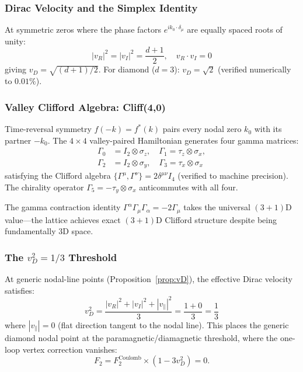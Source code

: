 \documentclass[aps,prd,onecolumn,superscriptaddress,floatfix,12pt]{revtex4-2}
\begin{document}
\subsubsection{Dirac Velocity and the Simplex Identity}

At symmetric zeros where the phase factors $e^{ik_0 \cdot \delta_\mu}$ are equally spaced roots of unity:
\begin{equation}
|v_R|^2 = |v_I|^2 = \frac{d+1}{2}, \quad v_R \cdot v_I = 0
\end{equation}
giving $v_D = \sqrt{(d{+}1)/2}$. For diamond ($d = 3$): $v_D = \sqrt{2}$ (verified numerically to $0.01\%$).

\subsubsection{Valley Clifford Algebra: Cliff(4,0)}

Time-reversal symmetry $f(-k) = f^*(k)$ pairs every nodal zero $k_0$ with its partner $-k_0$. The $4{\times}4$ valley-paired Hamiltonian generates four gamma matrices:
\begin{align}
\Gamma_0 &= I_2 \otimes \sigma_z, \quad \Gamma_1 = \tau_z \otimes \sigma_x, \nonumber \\
\Gamma_2 &= I_2 \otimes \sigma_y, \quad \Gamma_3 = \tau_x \otimes \sigma_x
\end{align}
satisfying the Clifford algebra $\{\Gamma^\mu, \Gamma^\nu\} = 2\delta^{\mu\nu} I_4$ (verified to machine precision). The chirality operator $\Gamma_5 = -\tau_y \otimes \sigma_x$ anticommutes with all four.

The gamma contraction identity $\Gamma^\alpha \Gamma_\mu \Gamma_\alpha = -2\Gamma_\mu$ takes the universal $(3{+}1)$D value---the lattice achieves exact $(3{+}1)$D Clifford structure despite being fundamentally 3D space.

\subsubsection{The $v_D^2 = 1/3$ Threshold}

At generic nodal-line points (Proposition~\ref{prop:vD}), the effective Dirac velocity satisfies:
\begin{equation}\label{eq:vd}
v_D^2 = \frac{|v_R|^2 + |v_I|^2 + |v_\parallel|^2}{3} = \frac{1 + 0}{3} = \frac{1}{3}
\end{equation}
where $|v_\parallel| = 0$ (flat direction tangent to the nodal line). This places the generic diamond nodal point at the paramagnetic/diamagnetic threshold, where the one-loop vertex correction vanishes:
\begin{equation}
F_2 = F_2^{\text{Coulomb}} \times (1 - 3v_D^2) = 0.
\end{equation}
\end{document}
